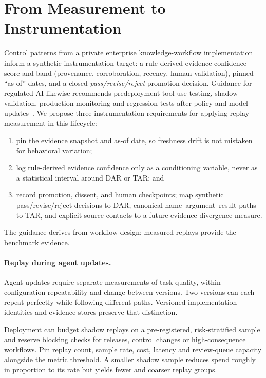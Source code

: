 \documentclass{article}
\begin{document}




\section{From Measurement to Instrumentation}

Control patterns from a private enterprise knowledge-workflow implementation
inform a synthetic instrumentation target: a rule-derived evidence-confidence
score and band (provenance, corroboration, recency, human validation), pinned
``as-of'' dates, and a closed \emph{pass/revise/reject} promotion decision.
Guidance for regulated AI likewise recommends predeployment tool-use testing,
shadow validation, production monitoring and regression tests after policy and
model updates~\citep{lfai2026safety}. We propose three instrumentation
requirements for applying replay measurement in this lifecycle:
\begin{enumerate}
  \item pin the evidence snapshot and as-of date, so freshness drift is not
  mistaken for behavioral variation;
  \item log rule-derived evidence confidence only as a conditioning variable,
  never as a statistical interval around DAR or TAR; and
  \item record promotion, dissent, and human checkpoints; map synthetic
  pass/revise/reject decisions to DAR, canonical name--argument--result paths to TAR,
  and explicit source contacts to a future evidence-divergence measure.
\end{enumerate}
The guidance derives from workflow design; measured replays provide the benchmark evidence.

\paragraph{Replay during agent updates.}
Agent updates require separate measurements of task quality,
within-configuration repeatability and change between versions. Two versions
can each repeat perfectly while following different paths. Versioned
implementation identities and evidence stores preserve that distinction.

Deployment can budget shadow replays on a pre-registered, risk-stratified sample
and reserve blocking checks for releases, control changes or high-consequence
workflows. Pin replay count, sample rate, cost, latency and review-queue capacity
alongside the metric threshold. A smaller shadow sample reduces spend
roughly in proportion to its rate but yields fewer and coarser replay groups.
\end{document}
